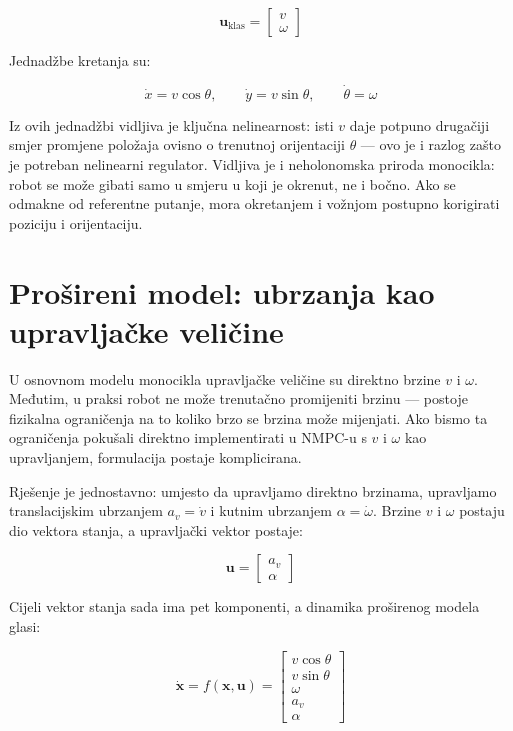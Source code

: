 \begin{equation}
  \mathbf{u}_{\text{klas}} = \begin{bmatrix} v \\ \omega \end{bmatrix}
\end{equation}

Jednadžbe kretanja su:

\begin{equation}
  \dot{x} = v\cos\theta, \qquad \dot{y} = v\sin\theta, \qquad \dot{\theta} = \omega
\end{equation}

Iz ovih jednadžbi vidljiva je ključna nelinearnost: isti $v$ daje potpuno drugačiji smjer promjene položaja ovisno o trenutnoj orijentaciji $\theta$ --- ovo je i razlog zašto je potreban nelinearni regulator. Vidljiva je i neholonomska priroda monocikla: robot se može gibati samo u smjeru u koji je okrenut, ne i bočno. Ako se odmakne od referentne putanje, mora okretanjem i vožnjom postupno korigirati poziciju i orijentaciju.

\section{Prošireni model: ubrzanja kao upravljačke veličine}

U osnovnom modelu monocikla upravljačke veličine su direktno brzine $v$ i $\omega$. Međutim, u praksi robot ne može trenutačno promijeniti brzinu --- postoje fizikalna ograničenja na to koliko brzo se brzina može mijenjati. Ako bismo ta ograničenja pokušali direktno implementirati u NMPC-u s $v$ i $\omega$ kao upravljanjem, formulacija postaje komplicirana.

Rješenje je jednostavno: umjesto da upravljamo direktno brzinama, upravljamo translacijskim ubrzanjem $a_v = \dot{v}$ i kutnim ubrzanjem $\alpha = \dot{\omega}$. Brzine $v$ i $\omega$ postaju dio vektora stanja, a upravljački vektor postaje:

\begin{equation}
  \mathbf{u} = \begin{bmatrix} a_v \\ \alpha \end{bmatrix}
\end{equation}

Cijeli vektor stanja sada ima pet komponenti, a dinamika proširenog modela glasi:

\begin{equation}
  \dot{\mathbf{x}} = f(\mathbf{x}, \mathbf{u}) =
  \begin{bmatrix}
    v\cos\theta \\
    v\sin\theta \\
    \omega \\
    a_v \\
    \alpha
  \end{bmatrix}
\end{equation}

